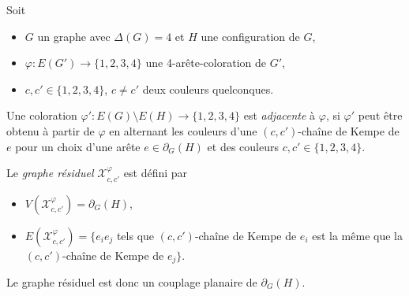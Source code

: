 \documentclass{beamer}
\begin{document}
\begin{frame}
Soit 
\begin{itemize}
\item $G$ un graphe avec $\Delta(G)=4$ et $H$ une configuration de $G$,
\item $\varphi:E(G')\to \{1,2,3,4\}$ une 4-arête-coloration de $G'$,
\item $c, c' \in \{1,2,3,4\}$, $c\ne c'$ deux couleurs quelconques. 
\end{itemize}

Une coloration $\varphi':E(G)\setminus E(H)\to \{1,2,3,4\}$ est \emph{adjacente} à $\varphi$, si $\varphi'$ peut être obtenu à partir de $\varphi$ en alternant les couleurs d'une $(c,c')$-chaîne de Kempe de $e$ pour un choix d'une arête $e\in\partial_G(H)$ et des couleurs $c,c'\in\{1,2,3,4\}$. 

\pause

%
%
%

Le \emph{graphe résiduel}
$\mathcal{X}^{\varphi}_{c,c'}$ est défini par
\begin{itemize}
\item $V(\mathcal{X}^{\varphi}_{c,c'}) = \partial_G(H)$, 
\item $E(\mathcal{X}^{\varphi}_{c,c'}) = \{ e_ie_j$ tels que $(c,c')$-chaîne de Kempe de $e_i$ est la même que la $(c,c')$-chaîne de Kempe de $e_j\}$.
\end{itemize}


Le graphe résiduel est donc un couplage planaire de $\partial_G(H)$.
\end{frame}
\end{document}
